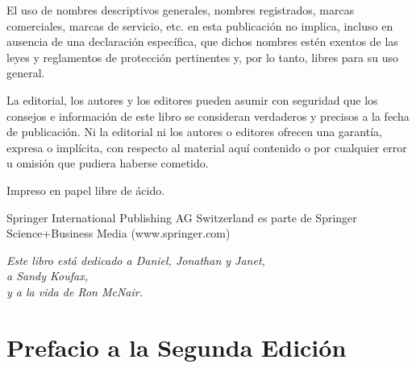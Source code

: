 ﻿\documentclass{book}
\begin{document}
\vspace{1em}
\noindent El uso de nombres descriptivos generales, nombres registrados, marcas comerciales, marcas de servicio, etc. en esta publicación no implica, incluso en ausencia de una declaración específica, que dichos nombres estén exentos de las leyes y reglamentos de protección pertinentes y, por lo tanto, libres para su uso general.

\vspace{1em}
\noindent La editorial, los autores y los editores pueden asumir con seguridad que los consejos e información de este libro se consideran verdaderos y precisos a la fecha de publicación. Ni la editorial ni los autores o editores ofrecen una garantía, expresa o implícita, con respecto al material aquí contenido o por cualquier error u omisión que pudiera haberse cometido.

\vspace{2.5em}
\noindent Impreso en papel libre de ácido.

\vspace{1.5em}
\noindent Springer International Publishing AG Switzerland es parte de Springer Science+Business Media (www.springer.com)
\clearpage

\thispagestyle{empty}
\vspace*{7cm}
\begin{center}
    \itshape
    Este libro está dedicado a Daniel, Jonathan y Janet, \\
    a Sandy Koufax, \\
    y a la vida de Ron McNair.
\end{center}
\clearpage

\chapter*{Prefacio a la Segunda Edición}
\end{document}
